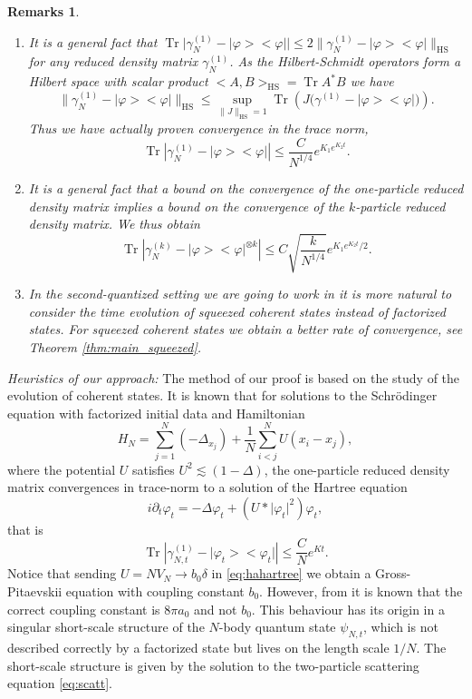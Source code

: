 \documentclass[11pt,a4paper,DIV11]{scrartcl}	%
\newtheorem*{rems}{Remarks}
\newcommand{\scal}[2]{\big<#1,#2\big>} %
\newcommand{\norm}[1]{\lVert#1\rVert}	%
\newcommand{\project}[1]{\lvert #1 \big>\big< #1\rvert}	%
\newcommand{\Tr}{\operatorname{Tr}}	%
\newcommand{\HS}{_{\textrm{HS}}}
\newcommand{\be}[1]{\begin{equation}\label{eq:#1}}	%
\newcommand{\ee}{\end{equation}}
\newcommand{\bd}{\begin{displaymath}}			%
\newcommand{\ed}{\end{displaymath}}
\newcommand{\eqr}[1]{\eqref{eq:#1}}			%
\begin{document}
\begin{rems}
\
\begin{enumerate}
\item It is a general fact \cite{RS2009} that $\Tr \big\lvert \gamma_{N}^{(1)} - \project{\varphi} \big\rvert \leq 2 \norm{\gamma_N^{(1)} - \project{\varphi}}\HS$ for any reduced density matrix $\gamma^{(1)}_N$. As the Hilbert-Schmidt operators form a Hilbert space with scalar product $\scal{A}{B}\HS = \Tr A^\ast B$ we have 
\[\norm{\gamma_N^{(1)} - \project{\varphi}}\HS \leq \sup_{\norm{J}\HS=1} \Tr \left( J \big( \gamma^{(1)}- \project{\varphi} \big) \right).\]
 Thus we have actually proven convergence in the trace norm,
\bd
\Tr \left\lvert \gamma_{N}^{(1)} - \project{\varphi} \right\rvert \leq \frac{C}{N^{1/4}}e^{K_1 e^{K_2 t}}.
\ed
\item It is a general fact \cite{KP2009} that a bound on the convergence of the one-particle reduced density matrix implies a bound on the convergence of the $k$-particle reduced density matrix. We thus obtain
\bd
\Tr \left\lvert \gamma_{N}^{(k)} - \project{\varphi}^{\otimes k} \right\rvert \leq C\sqrt{ \frac{k}{ N^{1/4} } }e^{K_1 e^{K_2 t}/2}.
\ed
\item In the second-quantized setting we are going to work in it is more natural to consider the time evolution of squeezed coherent states instead of factorized states. For squeezed coherent states we obtain a better rate of convergence, see Theorem \ref{thm:main_squeezed}.
\end{enumerate}
\end{rems}

\emph{Heuristics of our approach:} 
The method of our proof is based on the study of the evolution of coherent
states. It is known \cite{RS2009, CLS2011} that for solutions to the Schr\"odinger equation with factorized initial data and Hamiltonian
\[
H_N = \sum_{j=1}^N (-\Delta_{x_j}) + \frac{1}{N}\sum_{i<j}^N U(x_i-x_j),
\]
where the potential $U$ satisfies $U^2 \apprle (1-\Delta)$, the one-particle reduced density matrix convergences in trace-norm to a solution of the Hartree equation
\be{hahartree}
i \partial_t \varphi_t = -\Delta \varphi_t + \left(U \ast \lvert \varphi_t\rvert^2 \right) \varphi_t,
\ee
that is
\[
\Tr \left\lvert \gamma_{N,t}^{(1)} - \project{\varphi_t} \right\rvert \leq \frac{C}{N}e^{Kt}.
\]
Notice that sending $U = N V_N \to b_0
\delta$ in \eqr{hahartree} we obtain a Gross-Pitaevskii equation with coupling constant $b_0$.
However, from \cite{ESY2010} it is known that the correct coupling constant
is $8 \pi a_0$ and not $b_0$. %
This behaviour has its origin in a singular short-scale structure of the $N$-body
quantum state $\psi_{N,t}$, which is not described correctly by a factorized state but lives on the length scale $1/N$. The short-scale structure is given \cite{EMS2009} by the solution to the two-particle scattering equation \eqref{eq:scatt}.
\end{document}
